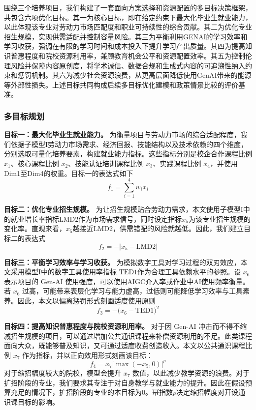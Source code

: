 \documentclass{mcmthesis}
\begin{document}
\noindent
围绕三个培养项目，我们构建了一套面向方案选择和资源配置的多目标决策框架，共包含六项优化目标。其一为核心目标，即在给定约束下最大化毕业生就业能力，以此体现该专业对劳动力市场匹配度和职业可持续性的综合贡献。其二为优化专业招生规模，实现供需适配并控制容量风险。其三为平衡利用GENAI的学习效率和学习收获，强调在有限的学习时间和成本投入下提升学习产出质量。其四为提高知识普惠程度和院校资源利用率，兼顾教育机会公平和资源配置效率。其五为控制伦理风险并保障内容原创度，将学术诚信、数据合规和生成式内容的可追溯性纳入约束和惩罚机制。其六为减少社会资源浪费，从更高层面降低使用GenAI带来的能源等外部性损失。上述目标共同构成后续多目标优化建模和政策情景比较的评价基准。

\subsubsection{多目标规划}
\noindent\textbf{目标一：最大化毕业生就业能力。}
为衡量项目与劳动力市场的综合适配程度，我们依据子模型I劳动力市场需求、经济回报、技能结构以及技术依赖的四个维度，分别选取可量化培养要素，构建就业能力指标。这些指标分别是校企合作课程比例 $x_1$、核心课程比例 $x_2$、技能认证培训课程比例 $x_3$、实践课程比例 $x_4$，并使用Dim1至Dim4的权重。目标一的表达式如下
\begin{equation}
f_1=\sum_{i=1}^{4} w_i x_i 
\end{equation}

\noindent\textbf{目标二：优化专业招生规模。}
为让招生规模贴合劳动力需求，本文使用子模型I中的就业增长率指标$\mathrm{LMD2}$作为市场需求信号，同时设定指标$x_5$为该专业招生规模的变化率。直观来看，$x_5$越接近$\mathrm{LMD2}$，供需错配的风险就越低。因此，我们建立目标二的表达式
\begin{equation}
f_2=-\bigl|x_5-\mathrm{LMD2}\bigr|
\end{equation}

\noindent\textbf{目标三：平衡学习效率与学习收获。}
为模拟数字工具对学习过程的双刃效应，本文采用模型I中的数字工具使用率指标 $\mathrm{TED1}$作为合理工具依赖水平的参照。设 $x_6$ 表示项目的 Gen-AI 使用强度，可以使用AIGC介入率或作业中AI使用频率衡量。若 $x_6$ 过高，可能带来表层化学习与能力虚高，过低则可能降低学习效率与工具素养。因此，本文以偏离惩罚形式刻画适度使用原则
\begin{equation}
f_3=-\bigl(x_6-\mathrm{TED1}\bigr)^2
\end{equation}

\noindent\textbf{目标四：提高知识普惠程度与院校资源利用率。}
对于因 Gen-AI 冲击而不得不缩减招生规模的项目，可以通过增加公共通识课程来补偿资源利用的不足。此类课程面向大众，既能够普及知识，又可通过适度收费创造收入。本文以公共通识课程比例 $x_7$ 作为指标，并以正向效用形式刻画该目标：
\begin{equation}
f_4= x_7\bigl[\max(-x_5,0)\bigr]^p
\end{equation}
对于缩招幅度较大的院校，模型会提升 $x_7$ 数值，以此减少教学资源的浪费。对于扩招阶段的专业，我们要求其专注于对自身教学与就业能力的提升。因此在假设预算充足的情况下，扩招阶段的专业的本目标为0。幂指数$p$决定缩招幅度对开设通识课目标的影响。
\end{document}
